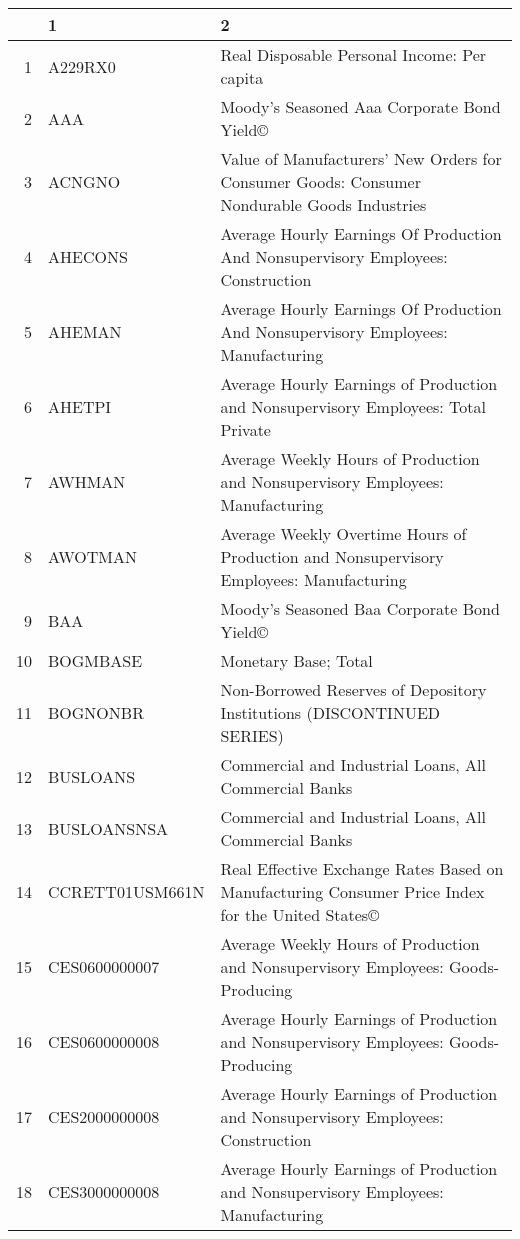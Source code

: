 \begin{table}[ht]
\centering
\begin{tabular}{rll}
  \hline
 & 1 & 2 \\ 
  \hline
1 & A229RX0 & Real Disposable Personal Income: Per capita \\ 
  2 & AAA & Moody's Seasoned Aaa Corporate Bond Yield© \\ 
  3 & ACNGNO & Value of Manufacturers' New Orders for Consumer Goods: Consumer Nondurable Goods Industries \\ 
  4 & AHECONS & Average Hourly Earnings Of Production And Nonsupervisory Employees: Construction \\ 
  5 & AHEMAN & Average Hourly Earnings Of Production And Nonsupervisory Employees: Manufacturing \\ 
  6 & AHETPI & Average Hourly Earnings of Production and Nonsupervisory Employees: Total Private \\ 
  7 & AWHMAN & Average Weekly Hours of Production and Nonsupervisory Employees: Manufacturing \\ 
  8 & AWOTMAN & Average Weekly Overtime Hours of Production and Nonsupervisory Employees: Manufacturing \\ 
  9 & BAA & Moody's Seasoned Baa Corporate Bond Yield© \\ 
  10 & BOGMBASE & Monetary Base; Total \\ 
  11 & BOGNONBR & Non-Borrowed Reserves of Depository Institutions (DISCONTINUED SERIES) \\ 
  12 & BUSLOANS & Commercial and Industrial Loans, All Commercial Banks \\ 
  13 & BUSLOANSNSA & Commercial and Industrial Loans, All Commercial Banks \\ 
  14 & CCRETT01USM661N & Real Effective Exchange Rates Based on Manufacturing Consumer Price Index for the United States© \\ 
  15 & CES0600000007 & Average Weekly Hours of Production and Nonsupervisory Employees: Goods-Producing \\ 
  16 & CES0600000008 & Average Hourly Earnings of Production and Nonsupervisory Employees: Goods-Producing \\ 
  17 & CES2000000008 & Average Hourly Earnings of Production and Nonsupervisory Employees: Construction \\ 
  18 & CES3000000008 & Average Hourly Earnings of Production and Nonsupervisory Employees: Manufacturing \\ 

\end{tabular}
\end{table}
